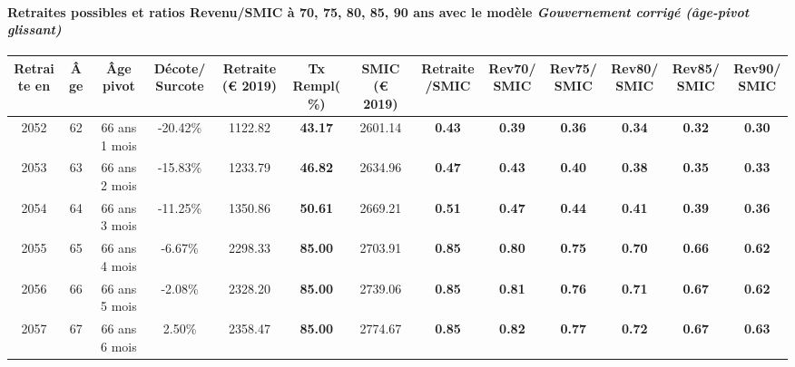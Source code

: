\paragraph{Retraites possibles et ratios Revenu/SMIC à 70, 75, 80, 85, 90 ans avec le modèle \emph{Gouvernement corrigé (âge-pivot glissant)}}  
 
{ \scriptsize \begin{center} 
\begin{tabular}[htb]{|c|c||c|c||c|c||c||c|c|c|c|c|c|} 
\hline 
 Retraite en &  Âge &  Âge pivot &  Décote/Surcote &  Retraite (\euro{} 2019) &  Tx Rempl(\%) &  SMIC (\euro{} 2019) &  Retraite/SMIC &  Rev70/SMIC &  Rev75/SMIC &  Rev80/SMIC &  Rev85/SMIC &  Rev90/SMIC \\ 
\hline \hline 
 2052 &  62 &  66 ans 1 mois &  -20.42\% &  1122.82 &  {\bf 43.17} &  2601.14 &  {\bf {\color{red} 0.43}} &  {\bf {\color{red} 0.39}} &  {\bf {\color{red} 0.36}} &  {\bf {\color{red} 0.34}} &  {\bf {\color{red} 0.32}} &  {\bf {\color{red} 0.30}} \\ 
\hline 
 2053 &  63 &  66 ans 2 mois &  -15.83\% &  1233.79 &  {\bf 46.82} &  2634.96 &  {\bf {\color{red} 0.47}} &  {\bf {\color{red} 0.43}} &  {\bf {\color{red} 0.40}} &  {\bf {\color{red} 0.38}} &  {\bf {\color{red} 0.35}} &  {\bf {\color{red} 0.33}} \\ 
\hline 
 2054 &  64 &  66 ans 3 mois &  -11.25\% &  1350.86 &  {\bf 50.61} &  2669.21 &  {\bf {\color{red} 0.51}} &  {\bf {\color{red} 0.47}} &  {\bf {\color{red} 0.44}} &  {\bf {\color{red} 0.41}} &  {\bf {\color{red} 0.39}} &  {\bf {\color{red} 0.36}} \\ 
\hline 
 2055 &  65 &  66 ans 4 mois &  -6.67\% &  2298.33 &  {\bf 85.00} &  2703.91 &  {\bf {\color{red} 0.85}} &  {\bf {\color{red} 0.80}} &  {\bf {\color{red} 0.75}} &  {\bf {\color{red} 0.70}} &  {\bf {\color{red} 0.66}} &  {\bf {\color{red} 0.62}} \\ 
\hline 
 2056 &  66 &  66 ans 5 mois &  -2.08\% &  2328.20 &  {\bf 85.00} &  2739.06 &  {\bf {\color{red} 0.85}} &  {\bf {\color{red} 0.81}} &  {\bf {\color{red} 0.76}} &  {\bf {\color{red} 0.71}} &  {\bf {\color{red} 0.67}} &  {\bf {\color{red} 0.62}} \\ 
\hline 
 2057 &  67 &  66 ans 6 mois &  2.50\% &  2358.47 &  {\bf 85.00} &  2774.67 &  {\bf {\color{red} 0.85}} &  {\bf {\color{red} 0.82}} &  {\bf {\color{red} 0.77}} &  {\bf {\color{red} 0.72}} &  {\bf {\color{red} 0.67}} &  {\bf {\color{red} 0.63}} \\ 
\hline 
\hline 
\end{tabular} 
\end{center} } 
